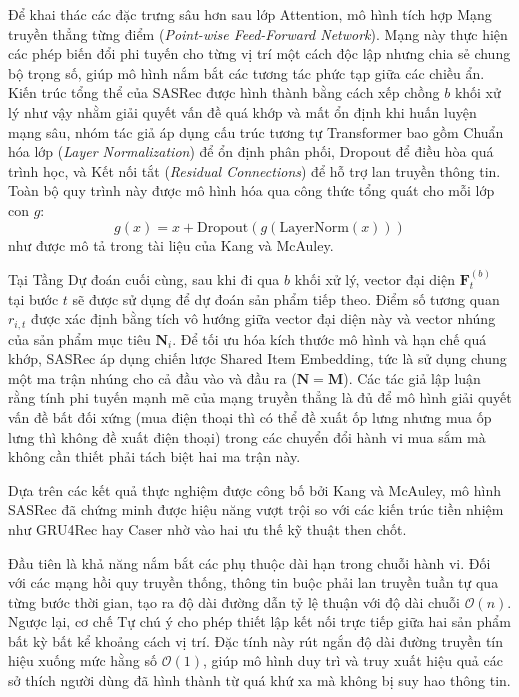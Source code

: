 Để khai thác các đặc trưng sâu hơn sau lớp Attention, mô hình tích hợp Mạng truyền thẳng từng điểm (\textit{Point-wise Feed-Forward Network}). Mạng này thực hiện các phép biến đổi phi tuyến cho từng vị trí một cách độc lập nhưng chia sẻ chung bộ trọng số, giúp mô hình nắm bắt các tương tác phức tạp giữa các chiều ẩn. Kiến trúc tổng thể của SASRec được hình thành bằng cách xếp chồng $b$ khối xử lý như vậy nhằm giải quyết vấn đề quá khớp và mất ổn định khi huấn luyện mạng sâu, nhóm tác giả áp dụng cấu trúc tương tự Transformer bao gồm Chuẩn hóa lớp (\textit{Layer Normalization}) để ổn định phân phối, Dropout để điều hòa quá trình học, và Kết nối tắt (\textit{Residual Connections}) để hỗ trợ lan truyền thông tin. Toàn bộ quy trình này được mô hình hóa qua công thức tổng quát cho mỗi lớp con $g$:
\begin{equation}
    g(x) = x + \text{Dropout}(g(\text{LayerNorm}(x)))
\end{equation}
như được mô tả trong tài liệu của Kang và McAuley.

Tại Tầng Dự đoán cuối cùng, sau khi đi qua $b$ khối xử lý, vector đại diện $\mathbf{F}_t^{(b)}$ tại bước $t$ sẽ được sử dụng để dự đoán sản phẩm tiếp theo. Điểm số tương quan $r_{i,t}$ được xác định bằng tích vô hướng giữa vector đại diện này và vector nhúng của sản phẩm mục tiêu $\mathbf{N}_i$. Để tối ưu hóa kích thước mô hình và hạn chế quá khớp, SASRec áp dụng chiến lược Shared Item Embedding, tức là sử dụng chung một ma trận nhúng cho cả đầu vào và đầu ra ($\mathbf{N}=\mathbf{M}$). Các tác giả lập luận rằng tính phi tuyến mạnh mẽ của mạng truyền thẳng là đủ để mô hình giải quyết vấn đề bất đối xứng (mua điện thoại thì có thể đề xuất ốp lưng nhưng mua ốp lưng thì không đề xuất điện thoại) trong các chuyển đổi hành vi mua sắm mà không cần thiết phải tách biệt hai ma trận này.

Dựa trên các kết quả thực nghiệm được công bố bởi Kang và McAuley, mô hình SASRec đã chứng minh được hiệu năng vượt trội so với các kiến trúc tiền nhiệm như GRU4Rec hay Caser nhờ vào hai ưu thế kỹ thuật then chốt.

Đầu tiên là khả năng nắm bắt các phụ thuộc dài hạn trong chuỗi hành vi. Đối với các mạng hồi quy truyền thống, thông tin buộc phải lan truyền tuần tự qua từng bước thời gian, tạo ra độ dài đường dẫn tỷ lệ thuận với độ dài chuỗi $\mathcal{O}(n)$. Ngược lại, cơ chế Tự chú ý cho phép thiết lập kết nối trực tiếp giữa hai sản phẩm bất kỳ bất kể khoảng cách vị trí. Đặc tính này rút ngắn độ dài đường truyền tín hiệu xuống mức hằng số $\mathcal{O}(1)$, giúp mô hình duy trì và truy xuất hiệu quả các sở thích người dùng đã hình thành từ quá khứ xa mà không bị suy hao thông tin.

